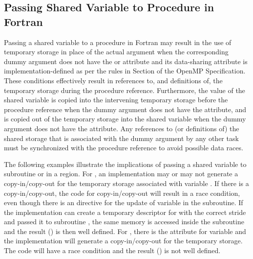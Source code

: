 \begin{fortranspecific}[4ex]
\section{Passing Shared Variable to Procedure in Fortran}
\label{sec:fort_shared_var}

Passing a shared variable to a procedure in Fortran may result in the use of
temporary storage in place of the actual argument when the corresponding dummy 
argument does not have the  or  attribute and 
its data-sharing attribute is implementation-defined as per the rules in 
Section  of
the OpenMP Specification. 
These conditions effectively result in references to, and definitions of, the 
temporary storage during the procedure reference. Furthermore, the value of the 
shared variable is copied into the intervening temporary storage before the 
procedure reference when the dummy argument does not have the 
 attribute, and is copied out of the temporary storage into 
the shared variable when the dummy argument does not have the 
 attribute. Any references to (or definitions of) the shared 
storage that is associated with the dummy argument by any other task must be 
synchronized with the procedure reference to avoid possible data races.

The following examples illustrate the implications of passing a shared 
variable  to subroutine  or  in
a  region.
For , an implementation may or may not generate a copy-in/copy-out 
for the temporary storage associated with variable . 
If there is a copy-in/copy-out, the code for copy-in/copy-out will result in 
a race condition, even though there is an 
directive for the update of variable  in the subroutine. 
If the implementation can create a temporary descriptor for  
with the correct stride and passed it to subroutine , 
the same memory is accessed inside the subroutine and the result 
() is then well defined.
For , there is the  attribute for 
variable  and the implementation will generate a copy-in/copy-out 
for the temporary storage.
The code will have a race condition and the result () is
not well defined.

\end{fortranspecific}

